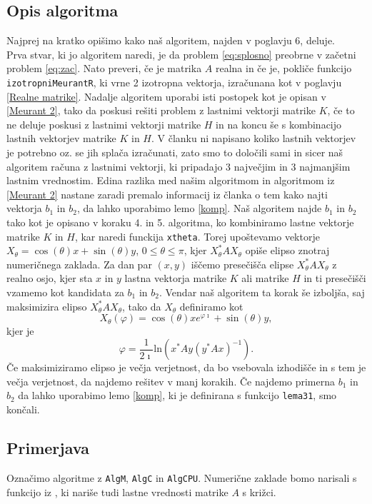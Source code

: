 \documentclass[12pt,a4paper]{amsart}
\theoremstyle{definition}
\theoremstyle{plain}
\begin{document}
\subsection{Opis algoritma}
Najprej na kratko opišimo kako naš algoritem, najden v poglavju 6, deluje. \\
Prva stvar, ki jo algoritem naredi, je da problem \eqref{eq:splosno} preobrne v začetni problem \eqref{eq:zac}. Nato preveri, če je matrika $A$ realna in če je, pokliče funkcijo \verb+izotropniMeurantR+, ki vrne 2 izotropna vektorja, izračunana kot v poglavju \ref{Realne matrike}. Nadalje algoritem uporabi isti postopek kot je opisan v \ref{Meurant 2}, tako da poskusi rešiti problem z lastnimi vektorji matrike $K$, če to ne deluje poskusi z lastnimi vektorji matrike $H$ in na koncu še s kombinacijo lastnih vektorjev matrike $K$ in $H$. V članku \cite{meurant} ni napisano koliko lastnih vektorjev je potrebno oz. se jih splača izračunati, zato smo to določili sami in sicer naš algoritem računa z lastnimi vektorji, ki pripadajo 3 največjim in 3 najmanjšim lastnim vrednostim. Edina razlika med našim algoritmom in algoritmom iz \ref{Meurant 2} nastane zaradi premalo informacij iz članka \cite{meurant} o tem kako najti vektorja $b_1$ in $b_2$, da lahko uporabimo lemo \ref{komp}. Naš algoritem najde $b_1$ in $b_2$ tako kot je opisano v koraku 4. in 5. algoritma, ko kombiniramo lastne vektorje matrike $K$ in $H$, kar naredi funckija \verb+xtheta+. Torej upoštevamo vektorje $X_\theta =\cos(\theta)x+\sin(\theta)y$, $0\le\theta\le\pi$, kjer $X_\theta ^\ast AX_\theta$ opiše elipso znotraj numeričnega zaklada. Za dan par $(x,y)$ iščemo presečišča elipse $X_\theta ^\ast AX_\theta$ z realno osjo, kjer sta $x$ in $y$ lastna vektorja matrike $K$ ali matrike $H$ in ti presečišči vzamemo kot kandidata za $b_1$ in $b_2$. Vendar naš algoritem ta korak še izboljša, saj maksimizira elipso $X_\theta ^\ast AX_\theta$, tako da $X_\theta$ definiramo kot $$X_\theta (\varphi) =\cos(\theta)x e^{\varphi \imath}+\sin(\theta)y,$$ kjer je $$\varphi = \frac{1}{2\imath} \text{ln}(x^\ast Ay (y^\ast Ax)^{-1}).$$ Če maksimiziramo elipso je večja verjetnost, da bo vsebovala izhodišče in s tem je večja verjetnost, da najdemo rešitev v manj korakih. Če najdemo primerna $b_1$ in $b_2$ da lahko uporabimo lemo \ref{komp}, ki je definirana s funkcijo \verb+lema31+, smo končali.
\subsection{Primerjava}
O\-zna\-či\-mo algoritme z \verb+AlgM+, \verb+AlgC+ in \verb+AlgCPU+. Numerične zaklade bomo narisali s funkcijo iz \cite{fovals}, ki nariše tudi lastne vrednosti matrike $A$ s križci.
\end{document}
